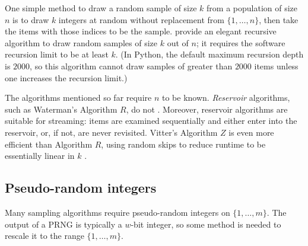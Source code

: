 \documentclass[graybox]{svmult}
\newcommand*\Let[2]{\State #1 $\gets$ #2}
\begin{document}
One simple method to draw a random sample of size $k$ from a population of size $n$
is to draw $k$ integers at random without replacement from  $\{1, \ldots, n\}$, then take the items with those indices to be the sample.
\cite{cormen_introduction_2009} provide an elegant recursive algorithm to draw random samples of size $k$ out of $n$; it requires the software recursion limit to be at least $k$.
(In Python, the default maximum recursion depth is $2000$, so this algorithm cannot draw samples of greater than $2000$ items unless one increases the recursion limit.)
%
%
%
%
%

The algorithms mentioned so far require $n$ to be known.
\emph{Reservoir} algorithms, such as Waterman's Algorithm $R$, do not  \cite{knuth_art_1997}.
Moreover, reservoir algorithms are suitable for streaming: items are examined
sequentially and either enter into the reservoir, or, if not, are never revisited.
Vitter's Algorithm $Z$ is even more efficient than Algorithm $R$,
using random skips to reduce runtime to be essentially linear in $k$ \cite{vitter_random_1985}.

\subsection{Pseudo-random integers}
\label{sec:integers}
Many sampling algorithms require pseudo-random integers on $\{1, \ldots, m\}$.
The output of a PRNG is typically a $w$-bit integer, so some method is needed to rescale it to the range $\{1, \ldots, m\}$.
\end{document}
